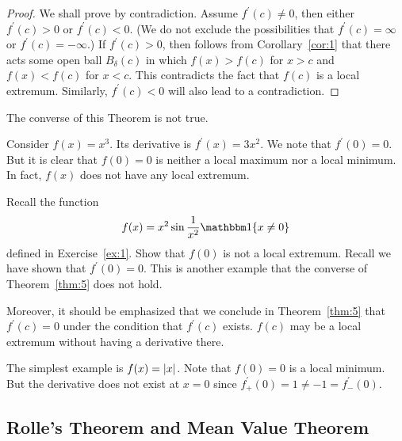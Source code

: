 \documentclass[thmcnt=section, 12pt]{my-elegantbook}
\begin{document}
\begin{proof}
    We shall prove by contradiction. Assume $f^\prime(c) \neq 0$, then either $f^\prime(c) > 0$ or $f^\prime(c) < 0$. (We do not exclude the possibilities that $f^\prime(c) = \infty$ or $f^\prime(c) = -\infty$.) If $f^\prime(c) > 0$, then follows from Corollary~\ref{cor:1} that there acts some open ball $B_\delta(c)$ in which $f(x) > f(c)$ for $x > c$ and $f(x) < f(c)$ for $x < c$. This contradicts the fact that $f(c)$ is a local extremum. Similarly, $f^\prime(c) < 0$ will also lead to a contradiction. 
\end{proof}

\par The converse of this Theorem is not true. 

\begin{example}
    Consider $f(x) = x^3$. Its derivative is $f^\prime(x) = 3x^2$. We note that $f^\prime(0) = 0$. But it is clear that $f(0) = 0$ is neither a local maximum nor a local minimum. In fact, $f(x)$ does not have any local extremum.
\end{example}

\begin{exercise}
    Recall the function 
    \begin{align*}
        f(x) = x^2 \sin \frac{1}{x^2} \ind\{x \neq 0\}
    \end{align*}
    defined in Exercise~\ref{ex:1}. Show that $f(0)$ is not a local extremum. Recall we have shown that $f^\prime(0) = 0$. This is another example that the converse of Theorem~\ref{thm:5} does not hold.
\end{exercise}

\par Moreover, it should be emphasized that we conclude in Theorem~\ref{thm:5} that $f^\prime(c) = 0$ under the condition that $f^\prime(c)$ exists. $f(c)$ may be a local extremum without having a derivative there.

\begin{example}
    The simplest example is $f(x) = \left\lvert x \right\rvert$. Note that $f(0) = 0$ is a local minimum. But the derivative does not exist at $x = 0$ since $f^\prime_{+}(0) = 1 \neq -1 = f^\prime_{-}(0)$.
\end{example}


\subsection{Rolle's Theorem and Mean Value Theorem}
\end{document}
